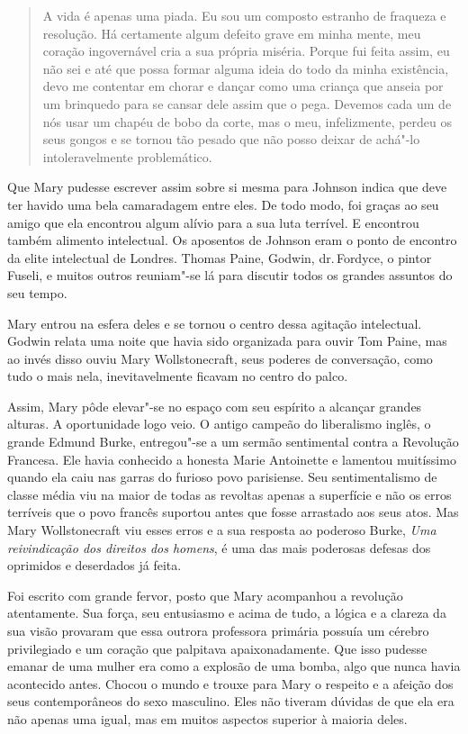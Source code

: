 \begin{quote}
A vida é apenas uma piada. Eu sou um composto estranho de fraqueza e
resolução. Há certamente algum defeito grave em minha mente, meu coração
ingovernável cria a sua própria miséria. Porque fui feita assim, eu não
sei e até que possa formar alguma ideia do todo da minha existência,
devo me contentar em chorar e dançar como uma criança que anseia por um
brinquedo para se cansar dele assim que o pega. Devemos cada um de nós
usar um chapéu de bobo da corte, mas o meu, infelizmente, perdeu os seus
gongos e se tornou tão pesado que não posso deixar de achá"-lo
intoleravelmente problemático.
\end{quote}

Que Mary pudesse escrever assim sobre si mesma para Johnson indica que
deve ter havido uma bela camaradagem entre eles. De todo modo, foi
graças ao seu amigo que ela encontrou algum alívio para a sua luta
terrível. E encontrou também alimento intelectual. Os aposentos de
Johnson eram o ponto de encontro da elite intelectual de Londres. Thomas
Paine, Godwin, dr.\,Fordyce, o pintor Fuseli, e muitos outros reuniam"-se
lá para discutir todos os grandes assuntos do seu tempo.

Mary entrou na esfera deles e se tornou o centro dessa agitação
intelectual. Godwin relata uma noite que havia sido organizada para
ouvir Tom Paine, mas ao invés disso ouviu Mary Wollstonecraft, seus
poderes de conversação, como tudo o mais nela, inevitavelmente ficavam
no centro do palco.

Assim, Mary pôde elevar"-se no espaço com seu espírito a alcançar grandes
alturas. A oportunidade logo veio. O antigo campeão do liberalismo
inglês, o grande Edmund Burke, entregou"-se a um sermão sentimental
contra a Revolução Francesa. Ele havia conhecido a honesta Marie
Antoinette e lamentou muitíssimo quando ela caiu nas garras do furioso
povo parisiense. Seu sentimentalismo de classe média viu na maior de
todas as revoltas apenas a superfície e não os erros terríveis que o
povo francês suportou antes que fosse arrastado aos seus atos. Mas Mary
Wollstonecraft viu esses erros e a sua resposta ao poderoso Burke,
\textit{Uma reivindicação dos direitos dos homens}, é uma das mais
poderosas defesas dos oprimidos e deserdados já feita.

Foi escrito com grande fervor, posto que Mary acompanhou a revolução atentamente.
Sua força, seu entusiasmo e acima de tudo, a lógica e a clareza da sua
visão provaram que essa outrora professora primária possuía um cérebro
privilegiado e um coração que palpitava apaixonadamente. Que isso
pudesse emanar de uma mulher era como a explosão de uma bomba, algo que
nunca havia acontecido antes. Chocou o mundo e trouxe para Mary o
respeito e a afeição dos seus contemporâneos do sexo masculino. Eles não
tiveram dúvidas de que ela era não apenas uma igual, mas em muitos
aspectos superior à maioria deles.

